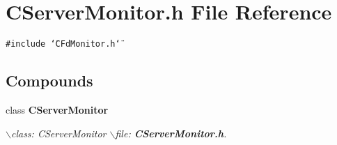 \section{CServer\-Monitor.h File Reference}
\label{CServerMonitor_8h}
{\tt \#include \char`\"{}CFd\-Monitor.h\char`\"{}}\par
\subsection*{Compounds}
\begin{CompactItemize}
\item 
class {\bf CServer\-Monitor}
\begin{CompactList}\small\item\em $\backslash$class: CServer\-Monitor $\backslash$file: {\bf CServer\-Monitor.h}.\item\end{CompactList}\end{CompactItemize}
